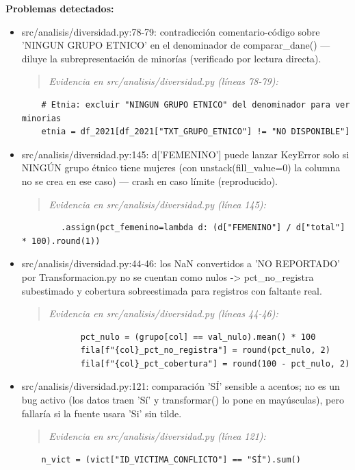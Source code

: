 \begin{tcolorbox}[riesgo]
\textbf{Problemas detectados:}
\begin{itemize}
  \item src/analisis/diversidad.py:78-79: contradicción comentario-código sobre 'NINGUN GRUPO ETNICO' en el denominador de comparar\_dane() --- diluye la subrepresentación de minorías (verificado por lectura directa).
\begin{quote}\footnotesize\ttfamily
\noindent\emph{Evidencia en src/analisis/diversidad.py (líneas 78-79):}
\end{quote}
\begin{lstlisting}
    # Etnia: excluir "NINGUN GRUPO ETNICO" del denominador para ver minorias
    etnia = df_2021[df_2021["TXT_GRUPO_ETNICO"] != "NO DISPONIBLE"]
\end{lstlisting}

  \item src/analisis/diversidad.py:145: d['FEMENINO'] puede lanzar KeyError solo si NINGÚN grupo étnico tiene mujeres (con unstack(fill\_value=0) la columna no se crea en ese caso) --- crash en caso límite (reproducido).
\begin{quote}\footnotesize\ttfamily
\noindent\emph{Evidencia en src/analisis/diversidad.py (línea 145):}
\end{quote}
\begin{lstlisting}
        .assign(pct_femenino=lambda d: (d["FEMENINO"] / d["total"] * 100).round(1))
\end{lstlisting}

  \item src/analisis/diversidad.py:44-46: los NaN convertidos a 'NO REPORTADO' por Transformacion.py no se cuentan como nulos -> pct\_no\_registra subestimado y cobertura sobreestimada para registros con faltante real.
\begin{quote}\footnotesize\ttfamily
\noindent\emph{Evidencia en src/analisis/diversidad.py (líneas 44-46):}
\end{quote}
\begin{lstlisting}
            pct_nulo = (grupo[col] == val_nulo).mean() * 100
            fila[f"{col}_pct_no_registra"] = round(pct_nulo, 2)
            fila[f"{col}_pct_cobertura"] = round(100 - pct_nulo, 2)
\end{lstlisting}

  \item src/analisis/diversidad.py:121: comparación 'SÍ' sensible a acentos; no es un bug activo (los datos traen 'Sí' y transformar() lo pone en mayúsculas), pero fallaría si la fuente usara 'Si' sin tilde.
\begin{quote}\footnotesize\ttfamily
\noindent\emph{Evidencia en src/analisis/diversidad.py (línea 121):}
\end{quote}
\begin{lstlisting}
    n_vict = (vict["ID_VICTIMA_CONFLICTO"] == "SÍ").sum()
\end{lstlisting}

\end{itemize}
\end{tcolorbox}

